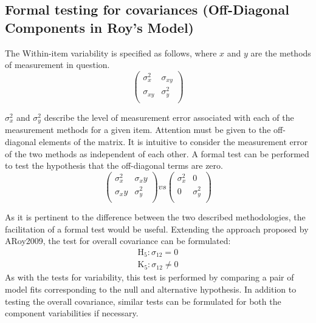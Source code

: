 \documentclass[12pt, a4paper]{report}
\theoremstyle{plain}
\theoremstyle{definition}
\theoremstyle{remark}
\begin{document}
	
	
	
	
	
	\subsection{Formal testing for covariances (Off-Diagonal Components in Roy's Model)}
	
	The Within-item variability is specified as follows, where $x$ and $y$ are the methods of measurement in question.
	\[ \left(
	\begin{array}{cc}
	\sigma^2_x & \sigma_{xy} \\
	\sigma_{xy} & \sigma^2_y \\
	\end{array}
	\right)
	\]
	
	$\sigma^2_x$ and $\sigma^2_y$ describe the level of measurement error associated with each of the measurement methods for a given item. Attention must be given to the off-diagonal elements of the matrix. It is intuitive to consider the measurement error of the two methods as independent of each other. A formal test can be performed to test the hypothesis that the off-diagonal terms are zero.
	\[ \left(
	\begin{array}{cc}
	\sigma^2_x & \sigma_xy \\
	\sigma_xy & \sigma^2_y \\
	\end{array}
	\right) vs \left(
	\begin{array}{cc}
	\sigma^2_x & 0 \\
	0 & \sigma^2_y \\
	\end{array}
	\right)
	\]
	
	As it is pertinent to the difference between the two described methodologies, the facilitation of a formal test would be useful. Extending the approach proposed by ARoy2009, the test for overall covariance can be formulated:
	\begin{eqnarray*}
		\operatorname{H_5} : \sigma_{12} = 0 \\
		\operatorname{K_5} : \sigma_{12} \neq 0
	\end{eqnarray*}
	As with the tests for variability, this test is performed by comparing a pair of model fits corresponding to the null and alternative hypothesis. In addition to testing the overall covariance, similar tests can be formulated for both the component variabilities if necessary.
	
\end{document}
